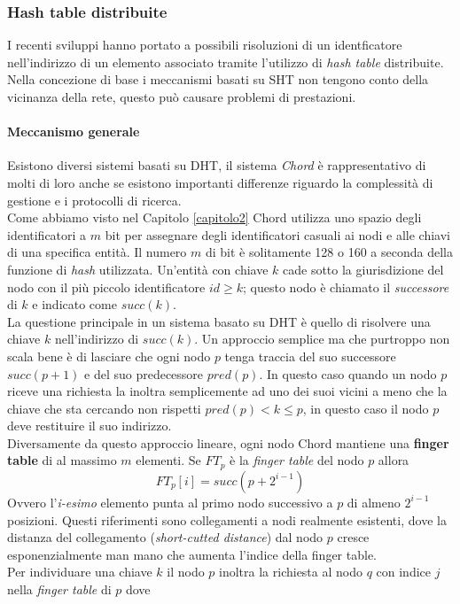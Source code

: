 \subsubsection{Hash table distribuite}
I recenti sviluppi hanno portato a possibili risoluzioni di un identficatore nell'indirizzo  di un elemento associato tramite l'utilizzo di \emph{hash table} distribuite. Nella concezione di base i meccanismi basati su SHT non tengono conto della vicinanza della rete, questo può causare problemi di prestazioni.
\paragraph{Meccanismo generale} 
Esistono diversi sistemi basati su DHT, il sistema \emph{Chord} è rappresentativo di molti di loro anche se esistono importanti differenze riguardo la complessità di gestione e i protocolli di ricerca.\\
Come abbiamo visto nel Capitolo \ref{capitolo2} Chord utilizza uno spazio degli identificatori a $m$ bit per assegnare degli identificatori casuali ai nodi e alle chiavi di una specifica entità. Il numero $m$ di bit è solitamente 128 o 160 a seconda della funzione di \emph{hash} utilizzata. Un'entità con chiave $k$ cade sotto la giurisdizione del nodo con il più piccolo identificatore $id \geq k$; questo nodo è chiamato il \emph{successore} di $k$ e indicato come $succ(k)$.\\
La questione principale in un sistema basato su DHT è quello di risolvere una chiave $k$ nell'indirizzo di $succ(k)$. Un approccio semplice ma che purtroppo non scala bene è di lasciare che ogni nodo $p$ tenga traccia del suo successore $succ(p+1)$ e del suo predecessore $pred(p)$. In questo caso quando un nodo $p$ riceve una richiesta la inoltra semplicemente ad uno dei suoi vicini a meno che la chiave che sta cercando non rispetti $pred(p) < k \leq p$, in questo caso il nodo $p$ deve restituire il suo indirizzo.\\
Diversamente da questo approccio lineare, ogni nodo Chord mantiene una \textbf{finger table} di al massimo $m$ elementi. Se $FT_p$ è la \emph{finger table} del nodo $p$ allora 
$$FT_p[i] = succ(p+2^{i-1})$$
Ovvero l'\emph{i-esimo} elemento punta al primo nodo successivo a $p$ di almeno $2^{i-1}$ posizioni. Questi riferimenti sono collegamenti a nodi realmente esistenti, dove la distanza del collegamento (\emph{short-cutted distance}) dal nodo $p$ cresce esponenzialmente man mano che aumenta l'indice della finger table.\\
Per individuare una chiave $k$ il nodo $p$ inoltra la richiesta al nodo $q$ con indice $j$ nella \emph{finger table} di $p$ dove
